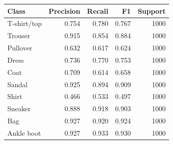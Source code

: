\begin{tabular}{lrrrr}
\toprule
Class & Precision & Recall & F1 & Support \\
\midrule
T-shirt/top & 0.754 & 0.780 & 0.767 & 1000 \\
Trouser & 0.915 & 0.854 & 0.884 & 1000 \\
Pullover & 0.632 & 0.617 & 0.624 & 1000 \\
Dress & 0.736 & 0.770 & 0.753 & 1000 \\
Coat & 0.709 & 0.614 & 0.658 & 1000 \\
Sandal & 0.925 & 0.894 & 0.909 & 1000 \\
Shirt & 0.466 & 0.533 & 0.497 & 1000 \\
Sneaker & 0.888 & 0.918 & 0.903 & 1000 \\
Bag & 0.927 & 0.920 & 0.924 & 1000 \\
Ankle boot & 0.927 & 0.933 & 0.930 & 1000 \\
\bottomrule
\end{tabular}
